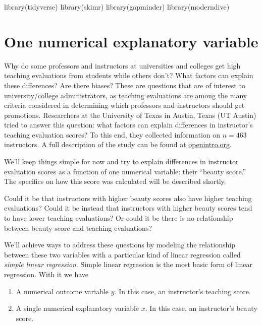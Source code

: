 \documentclass[
  letterpaper,
  DIV=11,
  numbers=noendperiod]{scrreprt}
\newenvironment{Shaded}{\begin{snugshade}}{\end{snugshade}}
\newcommand{\FunctionTok}[1]{\textcolor[rgb]{0.28,0.35,0.67}{#1}}
\newcommand{\NormalTok}[1]{\textcolor[rgb]{0.00,0.23,0.31}{#1}}
\theoremstyle{definition}
\theoremstyle{remark}
\begin{document}
\begin{Shaded}
\begin{Highlighting}[]
\FunctionTok{library}\NormalTok{(tidyverse)}
\FunctionTok{library}\NormalTok{(skimr)}
\FunctionTok{library}\NormalTok{(gapminder)}
\FunctionTok{library}\NormalTok{(moderndive)}
\end{Highlighting}
\end{Shaded}

\hypertarget{sec-model1}{%
\section{One numerical explanatory variable}\label{sec-model1}}

Why do some professors and instructors at universities and colleges get
high teaching evaluations from students while others don't? What factors
can explain these differences? Are there biases? These are questions
that are of interest to university/college administrators, as teaching
evaluations are among the many criteria considered in determining which
professors and instructors should get promotions. Researchers at the
University of Texas in Austin, Texas (UT Austin) tried to answer this
question: what factors can explain differences in instructor's teaching
evaluation scores? To this end, they collected information on
\(n = 463\) instructors. A full description of the study can be found at
\href{https://www.openintro.org/stat/data/?data=evals}{openintro.org}.

We'll keep things simple for now and try to explain differences in
instructor evaluation scores as a function of one numerical variable:
their ``beauty score.'' The specifics on how this score was calculated
will be described shortly.

Could it be that instructors with higher beauty scores also have higher
teaching evaluations? Could it be instead that instructors with higher
beauty scores tend to have lower teaching evaluations? Or could it be
there is no relationship between beauty score and teaching evaluations?

We'll achieve ways to address these questions by modeling the
relationship between these two variables with a particular kind of
linear regression called \emph{simple linear regression}. Simple linear
regression is the most basic form of linear regression. With it we have

\begin{enumerate}
\def\labelenumi{\arabic{enumi}.}
\item
  A numerical outcome variable \(y\). In this case, an instructor's
  teaching score.
\item
  A single numerical explanatory variable \(x\). In this case, an
  instructor's beauty score.
\end{enumerate}
\end{document}
